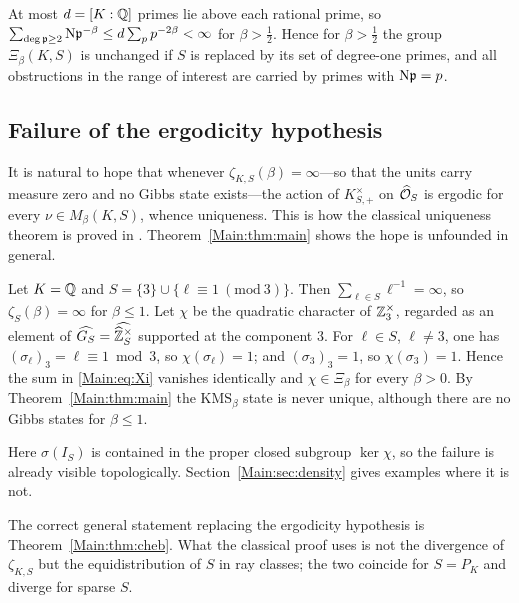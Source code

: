 \begin{remark}\label{Main:rem:degree}
At most $d=[K:\mathbb{Q}]$ primes lie above each rational prime, so
$\sum_{\deg\mathfrak{p}\ge2}\mathrm{N}\mathfrak{p}^{-\beta}\le d\sum_pp^{-2\beta}<\infty$ for
$\beta>\tfrac12$. Hence for $\beta>\tfrac12$ the group $\Xi_\beta(K,S)$ is
unchanged if $S$ is replaced by its set of degree-one primes, and all
obstructions in the range of interest are carried by primes with $\mathrm{N}\mathfrak{p}=p$.
\end{remark}

\subsection{Failure of the ergodicity hypothesis}

It is natural to hope that whenever $\zeta_{K,S}(\beta)=\infty$---so that the
units carry measure zero and no Gibbs state exists---the action of
$K^\times_{S,+}$ on $\widehat{\mathcal{O}}_S$ is ergodic for every $\nu\in M_\beta(K,S)$, whence
uniqueness. This is how the classical uniqueness theorem is proved in
\cite{Nesh02}. Theorem~\ref{Main:thm:main} shows the hope is unfounded in general.

\begin{example}\label{Main:ex:first}
Let $K=\mathbb{Q}$ and $S=\{3\}\cup\{\ell\equiv1\ (\mathrm{mod}\ 3)\}$. Then
$\sum_{\ell\in S}\ell^{-1}=\infty$, so $\zeta_S(\beta)=\infty$ for $\beta\le1$.
Let $\chi$ be the quadratic character of $\mathbb{Z}_3^\times$, regarded as an element
of $\widehat{G_S}=\widehat{\widehat{\mathbb{Z}}_S^\times}$ supported at the component $3$. For
$\ell\in S$, $\ell\neq3$, one has $(\sigma_\ell)_3=\ell\equiv1\bmod3$, so
$\chi(\sigma_\ell)=1$; and $(\sigma_3)_3=1$, so $\chi(\sigma_3)=1$. Hence the
sum in \eqref{Main:eq:Xi} vanishes identically and $\chi\in\Xi_\beta$ for every
$\beta>0$. By Theorem~\ref{Main:thm:main} the $\mathrm{KMS}_\beta$ state is never
unique, although there are no Gibbs states for $\beta\le1$.

Here $\sigma(I_S)$ is contained in the proper closed subgroup $\ker\chi$, so
the failure is already visible topologically. Section~\ref{Main:sec:density} gives
examples where it is not.
\end{example}

\begin{remark}
The correct general statement replacing the ergodicity hypothesis is
Theorem~\ref{Main:thm:cheb}. What the classical proof uses is not the divergence of
$\zeta_{K,S}$ but the equidistribution of $S$ in ray classes; the two coincide
for $S=P_K$ and diverge for sparse $S$.
\end{remark}

